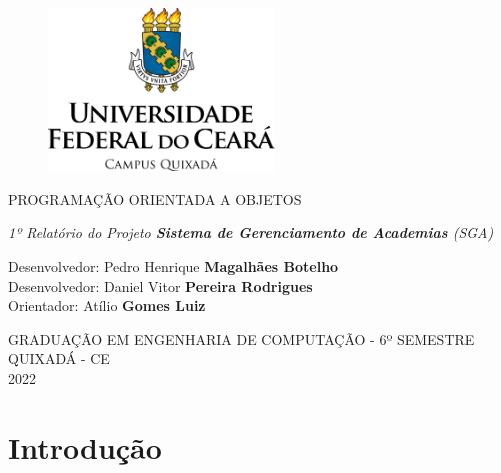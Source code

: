 \documentclass[12pt]{article}
\author{Pedro Botelho & Daniel Vitor}
\begin{document}
\begin{titlepage}
\begin{center}
\large


\begin{figure}[!h]
\centering
\includegraphics[width=6cm]{logo.png}
\end{figure}
\vspace{2cm}
\Large PROGRAMAÇÃO ORIENTADA A OBJETOS \par \vspace{2cm}
\large \textit{1º Relatório do Projeto \textbf{Sistema de Gerenciamento de Academias} (SGA)} \\ \vspace{2cm}
\begin{flushleft}
\textnormal{Desenvolvedor: Pedro Henrique \textbf{Magalhães Botelho}}\\ \vspace{0.5cm}
\textnormal{Desenvolvedor: Daniel Vitor \textbf{Pereira Rodrigues}}\\ \vspace{0.5cm}
\textnormal{Orientador: Atílio \textbf{Gomes Luiz}}\\ \vspace{2.5cm}
\end{flushleft}
GRADUAÇÃO EM ENGENHARIA DE COMPUTAÇÃO - 6º SEMESTRE\\ \vspace{2.5cm}
QUIXADÁ - CE\\
2022 \par
\end{center}
\end{titlepage}

\tableofcontents
\newpage

\newpage
{}

\section{Introdução}
\end{document}
